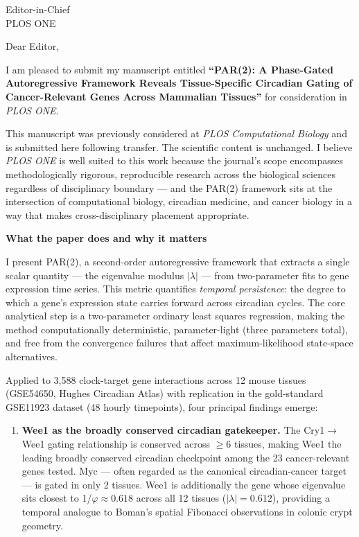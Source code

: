 \documentclass[11pt]{letter}
\begin{document}
\begin{letter}{Editor-in-Chief \\ PLOS ONE}

\opening{Dear Editor,}

I am pleased to submit my manuscript entitled \textbf{``PAR(2): A Phase-Gated Autoregressive Framework Reveals Tissue-Specific Circadian Gating of Cancer-Relevant Genes Across Mammalian Tissues''} for consideration in \textit{PLOS ONE}.

This manuscript was previously considered at \textit{PLOS Computational Biology} and is submitted here following transfer. The scientific content is unchanged. I believe \textit{PLOS ONE} is well suited to this work because the journal's scope encompasses methodologically rigorous, reproducible research across the biological sciences regardless of disciplinary boundary --- and the PAR(2) framework sits at the intersection of computational biology, circadian medicine, and cancer biology in a way that makes cross-disciplinary placement appropriate.

\textbf{What the paper does and why it matters}

I present PAR(2), a second-order autoregressive framework that extracts a single scalar quantity --- the eigenvalue modulus $|\lambda|$ --- from two-parameter fits to gene expression time series. This metric quantifies \emph{temporal persistence}: the degree to which a gene's expression state carries forward across circadian cycles. The core analytical step is a two-parameter ordinary least squares regression, making the method computationally deterministic, parameter-light (three parameters total), and free from the convergence failures that affect maximum-likelihood state-space alternatives.

Applied to 3,588 clock-target gene interactions across 12 mouse tissues (GSE54650, Hughes Circadian Atlas) with replication in the gold-standard GSE11923 dataset (48 hourly timepoints), four principal findings emerge:

\begin{enumerate}

\item \textbf{Wee1 as the broadly conserved circadian gatekeeper.} The Cry1$\rightarrow$Wee1 gating relationship is conserved across $\geq$6 tissues, making Wee1 the leading broadly conserved circadian checkpoint among the 23 cancer-relevant genes tested. Myc --- often regarded as the canonical circadian-cancer target --- is gated in only 2 tissues. Wee1 is additionally the gene whose eigenvalue sits closest to 1/$\varphi \approx 0.618$ across all 12 tissues ($|\lambda|=0.612$), providing a temporal analogue to Boman's spatial Fibonacci observations in colonic crypt geometry.


\end{enumerate}
\end{letter}
\end{document}
